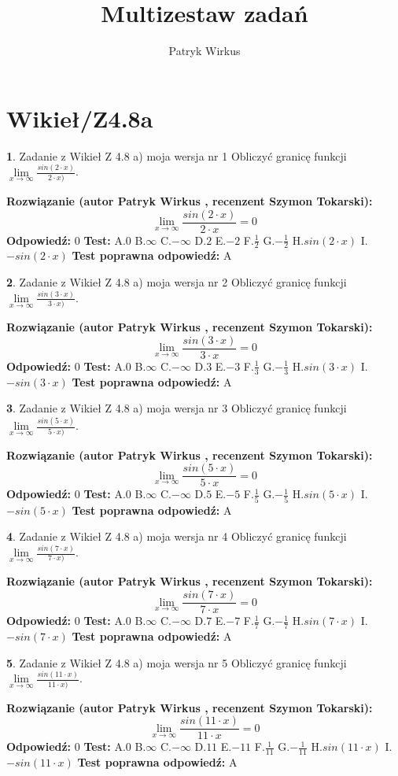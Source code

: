 \documentclass[12pt, a4paper]{article}
\title{Multizestaw zadań}
\author{Patryk Wirkus}
\date{}
\theoremstyle{definition} %
\newtheorem{zad}{}
\newcommand{\kategoria}[1]{\section{#1}}
\newcommand{\zadStart}[1]{\begin{zad}#1\newline}
\newcommand{\zadStop}{\end{zad}}
\newcommand{\rozwStart}[2]{\noindent \textbf{Rozwiązanie (autor #1 , recenzent #2): }\newline}
\newcommand{\rozwStop}{\newline}
\newcommand{\odpStart}{\noindent \textbf{Odpowiedź:}\newline}
\newcommand{\odpStop}{\newline}
\newcommand{\testStart}{\noindent \textbf{Test:}\newline}
\newcommand{\testStop}{\newline}
\newcommand{\kluczStart}{\noindent \textbf{Test poprawna odpowiedź:}\newline}
\newcommand{\kluczStop}{\newline}
\begin{document}
\maketitle

\kategoria{Wikieł/Z4.8a}


\zadStart{Zadanie z Wikieł Z 4.8 a) moja wersja nr 1}
Obliczyć granicę funkcji $\lim\limits_{x\to \infty}\frac{sin(2\cdot x)}{2\cdot x)}$.
\zadStop
\rozwStart{Patryk Wirkus}{Szymon Tokarski}
$$\lim\limits_{x\to \infty}\frac{sin(2\cdot x)}{2\cdot x}=
0$$
\rozwStop
\odpStart
$0$
\odpStop
\testStart
A.$0$ B.$\infty$ C.$-\infty$ D.$2$ E.$-2$
F.$\frac{1}{2}$ G.$-\frac{1}{2}$
H.$sin(2\cdot x)$
I.$-sin(2\cdot x)$
\testStop
\kluczStart
A
\kluczStop



\zadStart{Zadanie z Wikieł Z 4.8 a) moja wersja nr 2}
Obliczyć granicę funkcji $\lim\limits_{x\to \infty}\frac{sin(3\cdot x)}{3\cdot x)}$.
\zadStop
\rozwStart{Patryk Wirkus}{Szymon Tokarski}
$$\lim\limits_{x\to \infty}\frac{sin(3\cdot x)}{3\cdot x}=
0$$
\rozwStop
\odpStart
$0$
\odpStop
\testStart
A.$0$ B.$\infty$ C.$-\infty$ D.$3$ E.$-3$
F.$\frac{1}{3}$ G.$-\frac{1}{3}$
H.$sin(3\cdot x)$
I.$-sin(3\cdot x)$
\testStop
\kluczStart
A
\kluczStop



\zadStart{Zadanie z Wikieł Z 4.8 a) moja wersja nr 3}
Obliczyć granicę funkcji $\lim\limits_{x\to \infty}\frac{sin(5\cdot x)}{5\cdot x)}$.
\zadStop
\rozwStart{Patryk Wirkus}{Szymon Tokarski}
$$\lim\limits_{x\to \infty}\frac{sin(5\cdot x)}{5\cdot x}=
0$$
\rozwStop
\odpStart
$0$
\odpStop
\testStart
A.$0$ B.$\infty$ C.$-\infty$ D.$5$ E.$-5$
F.$\frac{1}{5}$ G.$-\frac{1}{5}$
H.$sin(5\cdot x)$
I.$-sin(5\cdot x)$
\testStop
\kluczStart
A
\kluczStop



\zadStart{Zadanie z Wikieł Z 4.8 a) moja wersja nr 4}
Obliczyć granicę funkcji $\lim\limits_{x\to \infty}\frac{sin(7\cdot x)}{7\cdot x)}$.
\zadStop
\rozwStart{Patryk Wirkus}{Szymon Tokarski}
$$\lim\limits_{x\to \infty}\frac{sin(7\cdot x)}{7\cdot x}=
0$$
\rozwStop
\odpStart
$0$
\odpStop
\testStart
A.$0$ B.$\infty$ C.$-\infty$ D.$7$ E.$-7$
F.$\frac{1}{7}$ G.$-\frac{1}{7}$
H.$sin(7\cdot x)$
I.$-sin(7\cdot x)$
\testStop
\kluczStart
A
\kluczStop



\zadStart{Zadanie z Wikieł Z 4.8 a) moja wersja nr 5}
Obliczyć granicę funkcji $\lim\limits_{x\to \infty}\frac{sin(11\cdot x)}{11\cdot x)}$.
\zadStop
\rozwStart{Patryk Wirkus}{Szymon Tokarski}
$$\lim\limits_{x\to \infty}\frac{sin(11\cdot x)}{11\cdot x}=
0$$
\rozwStop
\odpStart
$0$
\odpStop
\testStart
A.$0$ B.$\infty$ C.$-\infty$ D.$11$ E.$-11$
F.$\frac{1}{11}$ G.$-\frac{1}{11}$
H.$sin(11\cdot x)$
I.$-sin(11\cdot x)$
\testStop
\kluczStart
A
\kluczStop
\end{document}

